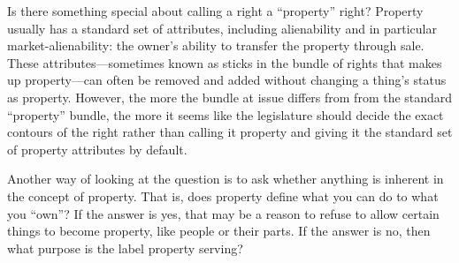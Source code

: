 Is there something special about calling a right a ``property'' right?  Property
usually has a standard set of attributes, including alienability and in
particular market-alienability: the owner's ability to transfer the property
through sale.  These attributes---sometimes known as sticks in the bundle of
rights that makes up property---can often be removed and added without
changing a thing's status as property.  However, the more the bundle at issue
differs from from the standard ``property'' bundle, the more it seems like the
legislature should decide the exact contours of the right rather than calling
it property and giving it the standard set of property attributes by default.

Another way of looking at the question is to ask whether anything is inherent in
the concept of property.  That is, does property define what you can do to what
you ``own''? If the answer is yes, that may be a reason to refuse to allow
certain things to become property, like people or their parts. If the answer is
no, then what purpose is the label property serving?

